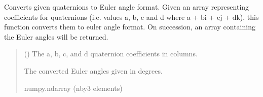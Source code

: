 \documentclass[letterpaper,10pt,english]{sphinxmanual}
\begin{document}
\begin{fulllineitems}
\label{\detokenize{modules/util/transformations:qnav.util.transformations.quaternion_to_euler_vec}}
\pysigstartsignatures
{}
\pysigstopsignatures
\sphinxAtStartPar
Converts given quaternions to Euler angle format.
Given an array representing coefficients for quaternions (i.e.
values a, b, c and d where a + bi + cj + dk), this function converts them
to euler angle format. On succession, an array containing the Euler angles
will be returned.
\begin{quote}\begin{description}
\sphinxAtStartPar
{} (\sphinxstyleliteralemphasis{\sphinxupquote{ (}}\sphinxstyleliteralemphasis{\sphinxupquote{)}}) \textendash{} The a, b, c, and d quaternion coefficients in columns.

\sphinxAtStartPar
The converted Euler angles given in degrees.

\sphinxAtStartPar
numpy.ndarray (n\sphinxhyphen{}by\sphinxhyphen{}3 elements)

\end{description}\end{quote}

\end{fulllineitems}

\end{document}
